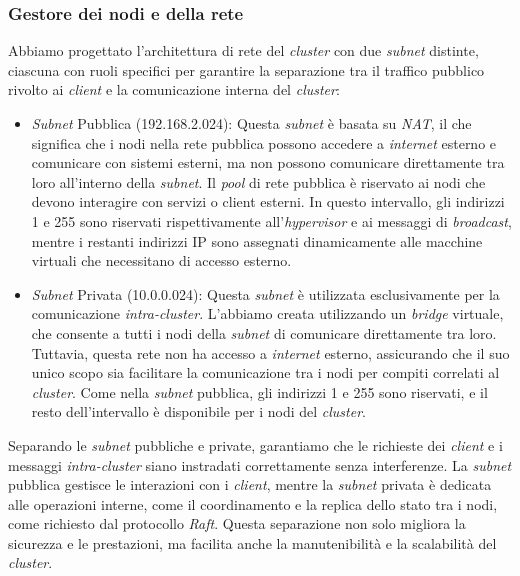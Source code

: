 \subsubsection{Gestore dei nodi e della rete}
Abbiamo progettato l'architettura di rete del \textit{cluster} con due \textit{subnet} distinte, ciascuna con ruoli specifici per garantire la separazione tra il traffico pubblico rivolto ai \textit{client} e la comunicazione interna del \textit{cluster}:
\begin{itemize}
  \item \textit{Subnet} Pubblica (192.168.2.0\/24): Questa \textit{subnet} è basata su \textit{NAT}, il che significa che i nodi nella rete pubblica possono accedere a \textit{internet} esterno e comunicare con sistemi esterni, 
    ma non possono comunicare direttamente tra loro all'interno della \textit{subnet}. Il \textit{pool} di rete pubblica è riservato ai nodi che devono interagire con servizi o client esterni. In questo intervallo, 
    gli indirizzi 1 e 255 sono riservati rispettivamente all'\textit{hypervisor} e ai messaggi di \textit{broadcast}, mentre i restanti indirizzi IP sono assegnati dinamicamente alle macchine virtuali che necessitano di 
    accesso esterno.
  \item \textit{Subnet} Privata (10.0.0.0\/24): Questa \textit{subnet} è utilizzata esclusivamente per la comunicazione \textit{intra-cluster}. L'abbiamo creata utilizzando un \textit{bridge} virtuale, che consente a tutti i 
    nodi della \textit{subnet} di comunicare direttamente tra loro. Tuttavia, questa rete non ha accesso a \textit{internet} esterno, assicurando che il suo unico scopo sia facilitare la comunicazione tra i nodi per compiti 
    correlati al \textit{cluster}. Come nella \textit{subnet} pubblica, gli indirizzi 1 e 255 sono riservati, e il resto dell'intervallo è disponibile per i nodi del \textit{cluster}.
\end{itemize}

Separando le \textit{subnet} pubbliche e private, garantiamo che le richieste dei \textit{client} e i messaggi \textit{intra-cluster} siano instradati correttamente senza interferenze. La \textit{subnet} pubblica gestisce 
le interazioni con i \textit{client}, mentre la \textit{subnet} privata è dedicata alle operazioni interne, come il coordinamento e la replica dello stato tra i nodi, come richiesto dal protocollo \textit{Raft}. Questa separazione 
non solo migliora la sicurezza e le prestazioni, ma facilita anche la manutenibilità e la scalabilità del \textit{cluster}.

